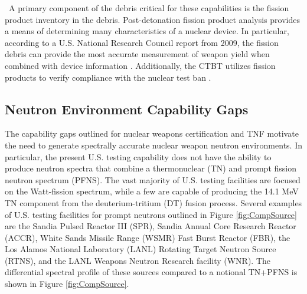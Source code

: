 \ A primary component of the debris critical for these capabilities is the fission product inventory in the debris. 
Post-detonation fission product analysis provides a means of determining many characteristics of a nuclear device. 
In particular, according to a U.S. National Research Council report from 2009, the fission debris can provide the most accurate measurement of weapon yield when combined with device information \cite{USNRC1}. 
Additionally, the CTBT utilizes fission products to verify compliance with the nuclear test ban \cite{Fedchenko2015}. 

\subsection{Neutron Environment Capability Gaps}
The capability gaps outlined for nuclear weapons certification and TNF motivate the need to generate spectrally accurate nuclear weapon neutron environments.  
In particular, the present U.S. testing capability does not have the ability to produce neutron spectra that combine a thermonuclear (TN) and prompt fission neutron spectrum (PFNS).  
The vast majority of U.S. testing facilities are focused on the Watt-fission spectrum, while a few are capable of producing the 14.1 MeV TN component from the deuterium-tritium (DT) fusion process\cite{Bridgman}. 
Several examples of U.S. testing facilities for prompt neutrons outlined in Figure \ref{fig:CompSource} are the Sandia Pulsed Reactor III (SPR), Sandia Annual Core Research Reactor (ACCR), White Sands Missile Range (WSMR) Fast Burst Reactor (FBR), the Los Alamos National Laboratory (LANL) Rotating Target Neutron Source (RTNS), and the LANL Weapons Neutron Research facility (WNR). 
The differential spectral profile of these sources compared to a notional TN+PFNS is shown in Figure \ref{fig:CompSource}. 

